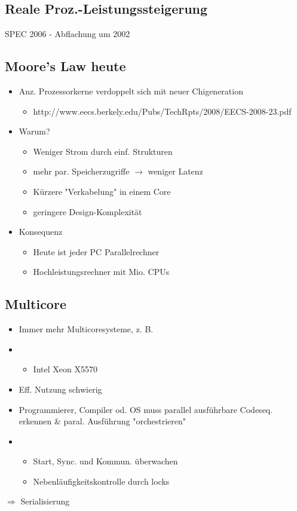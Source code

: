 \subsection{Reale Proz.-Leistungssteigerung}
SPEC 2006 - Abflachung um 2002

\subsection{Moore's Law heute}

\begin{itemize}
	\item Anz. Prozessorkerne verdoppelt sich mit neuer Chigeneration
		\begin{itemize}
			\item http://www.eecs.berkely.edu/Pubs/TechRpts/2008/EECS-2008-23.pdf
		\end{itemize}
	\item Warum?
		\begin{itemize}
			\item Weniger Strom durch einf. Strukturen
			\item mehr par. Speicherzugriffe $\rightarrow$ weniger Latenz
			\item Kürzere "Verkabelung" in einem Core
			\item geringere Design-Komplexität
		\end{itemize}
	\item Konsequenz
		\begin{itemize}
			\item Heute ist jeder PC Parallelrechner
			\item Hochleistungsrechner mit Mio. CPUs
		\end{itemize}
\end{itemize}


\subsection{Multicore}

\begin{itemize}
	\item  Immer mehr Multicoresysteme, z. B.
	\item 
		\begin{itemize}
			\item Intel Xeon X5570
		\end{itemize}
	\item  Eff. Nutzung schwierig
	\item  Programmierer, Compiler od. OS muss parallel ausführbare Codeseq. erkennen \& paral. Ausführung "orchestrieren"
	\item 
		\begin{itemize}
			\item Start, Sync. und Kommun. überwachen
			\item Nebenläufigkeitskontrolle durch locks
		\end{itemize}
\end{itemize}
$\Rightarrow$ Serialisierung

